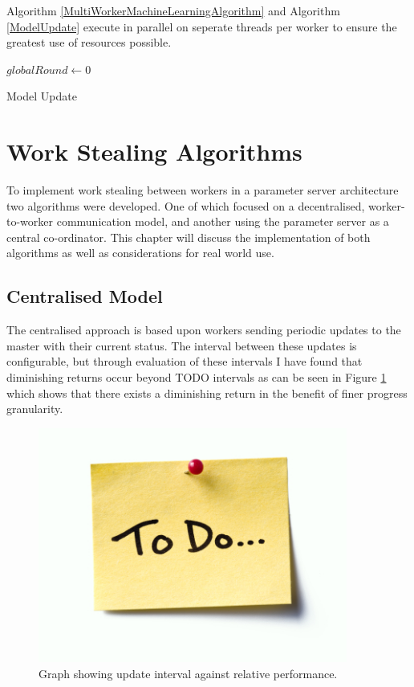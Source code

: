 \documentclass[12pt]{article}
\begin{document}
\medskip
\medskip

Algorithm \ref{MultiWorkerMachineLearningAlgorithm} and Algorithm \ref{ModelUpdate} execute in parallel on seperate threads per worker to ensure the greatest use of resources possible.
\newline

\IncMargin{1em}
\begin{algorithm}[H]
  $globalRound \longleftarrow 0$\;
 \caption{Model Update}
 \label{ModelUpdate}
\end{algorithm}
\DecMargin{1em}
\medskip

\newpage

\section{Work Stealing Algorithms}

To implement work stealing between workers in a parameter server architecture two algorithms were developed. One of which focused on a decentralised, worker-to-worker communication model, and another using the parameter server as a central co-ordinator. This chapter will discuss the implementation of both algorithms as well as considerations for real world use.

\subsection{Centralised Model}

The centralised approach is based upon workers sending periodic updates to the master with their current status. The interval between these updates is configurable, but through evaluation of these intervals I have found that diminishing returns occur beyond TODO intervals as can be seen in Figure \ref{IntervalGraph} which shows that there exists a diminishing return in the benefit of finer progress granularity.

\begin{figure}[H]
  \centering
  \includegraphics[width=4in]{todo}
  \caption[]{Graph showing update interval against relative performance.}
  \label{IntervalGraph}
\end{figure}
\end{document}

